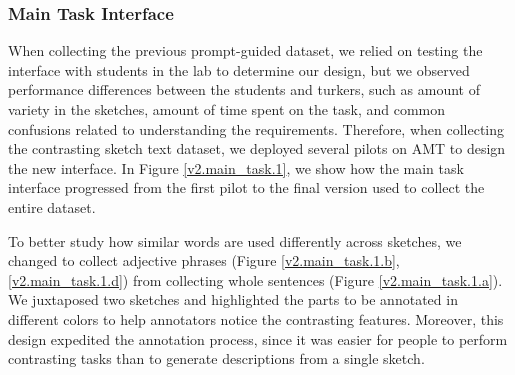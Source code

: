 \subsubsection{Main Task Interface}
When collecting the previous prompt-guided dataset, we relied on testing the interface with students in the lab to determine our design, but we observed performance differences between the students and turkers, such as amount of variety in the sketches, amount of time spent on the task, and common confusions related to understanding the requirements. 
Therefore, when collecting the contrasting sketch text dataset, we deployed several pilots on AMT to design the new interface.  
In Figure \ref{v2.main_task.1}, we show how the main task interface progressed from the first pilot to the final version used to collect the entire dataset. 

To better study how similar words are used differently across sketches, we changed to collect adjective phrases (Figure \ref{v2.main_task.1.b}, \ref{v2.main_task.1.d}) from collecting whole sentences (Figure \ref{v2.main_task.1.a}).  
We juxtaposed two sketches and highlighted the parts to be annotated in different colors to help annotators notice the contrasting features. 
Moreover, this design expedited the annotation process, since it was easier for people to perform contrasting tasks than to generate descriptions from a single sketch. 

